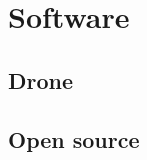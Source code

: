 \documentclass[Main]{subfiles}
\begin{document}
\chapter{Software}
\section{Drone}
\section{Open source}
\end{document}
